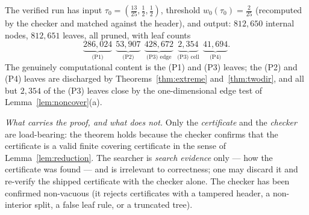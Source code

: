 \documentclass[11pt,reqno]{amsart}
\theoremstyle{plain}
\theoremstyle{definition}
\theoremstyle{remark}
\begin{document}
The verified run has input $\tau_0=(\tfrac{13}{25},\tfrac12,\tfrac12)$,
threshold $w_0(\tau_0)=\tfrac2{25}$ (recomputed by the checker and matched
against the header), and output: $812{,}650$ internal nodes, $812{,}651$
leaves, all pruned, with leaf counts
\[
\underbrace{286{,}024}_{\text{(P1)}}\ \
\underbrace{53{,}907}_{\text{(P2)}}\ \
\underbrace{428{,}672}_{\text{(P3) edge}}\ \
\underbrace{2{,}354}_{\text{(P3) cell}}\ \
\underbrace{41{,}694}_{\text{(P4)}} .
\]
The genuinely computational content is the (P1) and (P3) leaves; the (P2) and
(P4) leaves are discharged by Theorems~\ref{thm:extreme} and~\ref{thm:twodir},
and all but $2{,}354$ of the (P3) leaves close by the one-dimensional edge test
of Lemma~\ref{lem:noncover}(a).

\emph{What carries the proof, and what does not.} Only the \emph{certificate}
and the \emph{checker} are load-bearing: the theorem holds because the checker
confirms that the certificate is a valid finite covering certificate in the
sense of Lemma~\ref{lem:reduction}. The searcher is \emph{search evidence}
only --- how the certificate was found --- and is irrelevant to correctness;
one may discard it and re-verify the shipped certificate with the checker
alone. The checker has been confirmed non-vacuous (it rejects certificates with
a tampered header, a non-interior split, a false leaf rule, or a truncated
tree).
\end{document}
